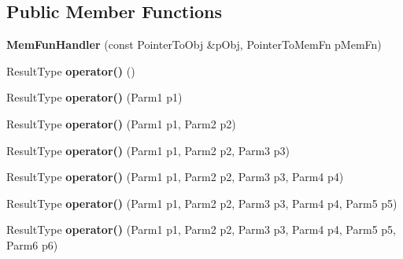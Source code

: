 \subsection*{Public Member Functions}
\begin{DoxyCompactItemize}
\item 
\hypertarget{classLoki_1_1MemFunHandler_a6bb0a050ac704a28243cacdacb4d1f59}{}{\bfseries Mem\+Fun\+Handler} (const Pointer\+To\+Obj \&p\+Obj, Pointer\+To\+Mem\+Fn p\+Mem\+Fn)\label{classLoki_1_1MemFunHandler_a6bb0a050ac704a28243cacdacb4d1f59}

\item 
\hypertarget{classLoki_1_1MemFunHandler_a41be4da48f86c56cf51262977615a452}{}Result\+Type {\bfseries operator()} ()\label{classLoki_1_1MemFunHandler_a41be4da48f86c56cf51262977615a452}

\item 
\hypertarget{classLoki_1_1MemFunHandler_a2551c0100f1398e1eb7d347279fda1f4}{}Result\+Type {\bfseries operator()} (Parm1 p1)\label{classLoki_1_1MemFunHandler_a2551c0100f1398e1eb7d347279fda1f4}

\item 
\hypertarget{classLoki_1_1MemFunHandler_a97cc538548f736b2e58bbe094b3fba21}{}Result\+Type {\bfseries operator()} (Parm1 p1, Parm2 p2)\label{classLoki_1_1MemFunHandler_a97cc538548f736b2e58bbe094b3fba21}

\item 
\hypertarget{classLoki_1_1MemFunHandler_ab91b537b8182177fe1860f4b360f8a36}{}Result\+Type {\bfseries operator()} (Parm1 p1, Parm2 p2, Parm3 p3)\label{classLoki_1_1MemFunHandler_ab91b537b8182177fe1860f4b360f8a36}

\item 
\hypertarget{classLoki_1_1MemFunHandler_aded442e8f3db410f66e649c96f382031}{}Result\+Type {\bfseries operator()} (Parm1 p1, Parm2 p2, Parm3 p3, Parm4 p4)\label{classLoki_1_1MemFunHandler_aded442e8f3db410f66e649c96f382031}

\item 
\hypertarget{classLoki_1_1MemFunHandler_a463862231ecd0040901d606491ccdbf2}{}Result\+Type {\bfseries operator()} (Parm1 p1, Parm2 p2, Parm3 p3, Parm4 p4, Parm5 p5)\label{classLoki_1_1MemFunHandler_a463862231ecd0040901d606491ccdbf2}

\item 
\hypertarget{classLoki_1_1MemFunHandler_a7ba81351a80e55efe1df1fe9945e6c54}{}Result\+Type {\bfseries operator()} (Parm1 p1, Parm2 p2, Parm3 p3, Parm4 p4, Parm5 p5, Parm6 p6)\label{classLoki_1_1MemFunHandler_a7ba81351a80e55efe1df1fe9945e6c54}


\end{DoxyCompactItemize}

